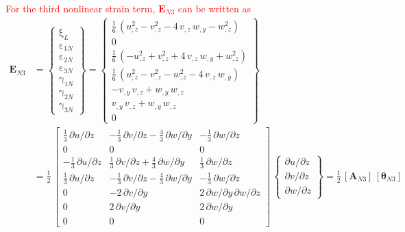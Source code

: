 \textcolor{red}{For the third nonlinear strain term, $\mathbf{E}_{N3}$ can be written as} 
\begin{equation}
\begin{aligned}
\mathbf{E}_{N3} & =  \begin{Bmatrix}
\mathrm \xi_{L} \\
\mathrm \varepsilon_{1N} \\
\mathrm \varepsilon_{2N} \\
\mathrm \varepsilon_{3N} \\
\mathrm \gamma_{1N} \\
\mathrm \gamma_{2N} \\
\mathrm \gamma_{3N} \end{Bmatrix} =
\begin{Bmatrix}
\tfrac{1}{6} \,  \left( u_{,z}^2 - v_{,z}^2 - 4 \, v_{,z} \, w_{,y} - w_{,z}^2   \right)\\
0 \\
\tfrac{1}{6} \,  \left( - u_{,z}^2 + v_{,z}^2 + 4 \, v_{,z} \, w_{,y} + w_{,z}^2  \right) \\
\tfrac{1}{6} \,  \left( u_{,z}^2 - v_{,z}^2 - w_{,z}^2 - 4 \, v_{,z} \, w_{,y}\right) \\ 
- v_{,y} \, v_{,z} + w_{,y} \, w_{,z} \\
v_{,y} \, v_{,z} + w_{,y} \, w_{,z} \\ 
0 \end{Bmatrix} \\
& = \frac{1}{2} \, \begin{bmatrix}
\tfrac{1}{3} \, \partial u / \partial z &  - \tfrac{1}{3} \, \partial v / \partial z - \tfrac{4}{3} \, \partial w / \partial y & - \tfrac{1}{3} \, \partial w / \partial z   \\
0 &  0 & 0  \\
- \tfrac{1}{3} \, \partial u / \partial z &  \tfrac{1}{3} \, \partial v / \partial z + \tfrac{4}{3} \, \partial w / \partial y & \tfrac{1}{3} \, \partial w / \partial z \\
\tfrac{1}{3} \, \partial u / \partial z &  - \tfrac{1}{3} \, \partial v / \partial z - \tfrac{4}{3} \, \partial w / \partial y & - \tfrac{1}{3} \, \partial w / \partial z \\
0 &  -2 \, \partial v / \partial y & 2\, \partial w/\partial y \, \partial w / \partial z \\
0 &  2 \, \partial v / \partial y & 2 \, \partial w / \partial y  \\
0 &  0 &  0  \end{bmatrix} \, \begin{Bmatrix}
\partial u / \partial z\\
\partial v / \partial z \\
\partial w / \partial z
\end{Bmatrix}
= \tfrac{1}{2} \, [\mathbf{A}_{N3}] \, [\boldsymbol{\theta}_{N3}]
\end{aligned}
\end{equation}

